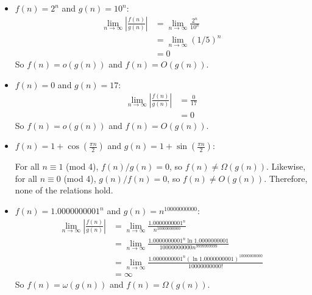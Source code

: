 \documentclass[12pt,twoside]{article}
\begin{document}
\begin{problem}{20}
{\begin{itemize}
  \item $f(n) = 2^n$ and $g(n) = 10^n$:
\begin{align*}
   	\lim_{n\to\infty} \left|\frac{f(n)}{g(n)}\right|
	&= \lim_{n\to\infty} \frac{2^n}{10^n} \\
	&= \lim_{n\to\infty} (1/5)^n \\
	&= 0
  \end{align*}
	 So $f(n) = o(g(n))$ and $f(n) = O(g(n))$.

\item $f(n) = 0$ and $g(n) = 17$:
\begin{align*}
   	\lim_{n\to\infty} \left|\frac{f(n)}{g(n)}\right|
	&= \frac{0}{17} \\
	&= 0
  \end{align*}
	 So $f(n) = o(g(n))$ and $f(n) = O(g(n))$.

\item $f(n) = 1+\cos\left(\frac{\pi n}{2}\right)$ and $g(n) = 1+\sin\left(\frac{\pi n}{2}\right)$:

	For all $n \equiv 1$ (mod 4), $f(n)/g(n) = 0$, so $f(n) \not= \Omega(g(n))$. Likewise, for all $n \equiv 0$ (mod 4), 
$g(n)/f(n) = 0$, so $f(n) \not= O(g(n))$. Therefore, none of the relations hold.

\item $f(n) = {1.0000000001}^n$ and $g(n) = n^{10000000000}$:
\begin{align*}
   	\lim_{n\to\infty} \left|\frac{f(n)}{g(n)}\right|
	&= \lim_{n\to\infty} \frac{1.0000000001^n}{n^{10000000000}} \\
	&= \lim_{n\to\infty} \frac{1.0000000001^n \ln 1.0000000001}{10000000000n^{9999999999}} \\
	&= \lim_{n\to\infty} \frac{1.0000000001^n (\ln 1.0000000001)^{10000000000}}{10000000000!} \\
	&= \infty
  \end{align*}
	 So $f(n) = \omega(g(n))$ and $f(n) = \Omega(g(n))$.

	
 \end{itemize}

}


\end{problem}
\end{document}
